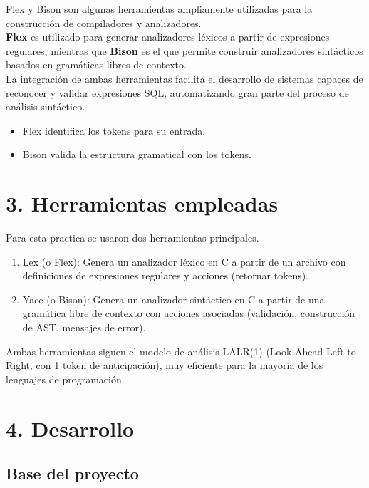 \documentclass{article}
\begin{document}
Flex y Bison son algunas herramientas ampliamente utilizadas para la construcción de compiladores y analizadores. \\

\textbf{Flex} es utilizado para generar analizadores léxicos a partir de expresiones regulares, mientras que \textbf{Bison} es el que permite construir analizadores sintácticos basados en gramáticas libres de contexto. \\

La integración de ambas herramientas facilita el desarrollo de sistemas capaces de reconocer y validar expresiones SQL, automatizando gran parte del proceso de análisis sintáctico.

\begin{itemize}
\item Flex identifica los tokens para su entrada.
\item Bison valida la estructura gramatical con los tokens.
\end{itemize}
    
    \newpage
    
\section{3. Herramientas empleadas}
Para esta practica se usaron dos herramientas principales. 
    \begin{enumerate}
        \item Lex (o Flex): Genera un analizador léxico en C a partir de un archivo con definiciones de expresiones regulares y acciones (retornar tokens).
        \item Yacc (o Bison): Genera un analizador sintáctico en C a partir de una gramática libre de contexto con acciones asociadas (validación, construcción de AST, mensajes de error).
    \end{enumerate}     
    Ambas herramientas siguen el modelo de análisis LALR(1) (Look-Ahead Left-to-Right, con 1 token de anticipación), muy eficiente para la mayoría de los lenguajes de programación.
    \newpage
    
\section{4. Desarrollo}

\subsection{Base del proyecto}
\end{document}
